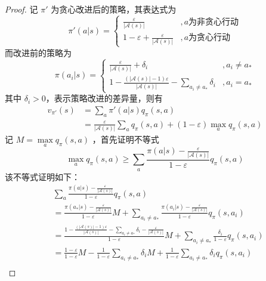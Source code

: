 \begin{proof}
    记 $\pi'$ 为贪心改进后的策略，其表达式为
    \begin{equation}
        \pi'(a|s)=
        \begin{cases}
            \frac{\varepsilon}{|\mathcal A(s)|}&, a\text{为非贪心行动}\\
            1-\varepsilon+\frac{\varepsilon}{|\mathcal A(s)|}&, a\text{为贪心行动}
        \end{cases}
    \end{equation}
    而改进前的策略为
    \begin{equation}
        \pi(a_i|s)=
\begin{cases}
\frac{\varepsilon}{|\mathcal A(s)|}+\delta_i&,a_i\neq a_*\\
1-\frac{(|\mathcal A(s)|-1)\varepsilon}{|\mathcal A(s)|}-\sum_{a_i\neq a_*}\delta_i&,a_i=a_*
\end{cases}
    \end{equation}
    其中 $\delta_i>0$，表示策略改进的差异量，则有
    \begin{equation}\label{eq:beforeineq}
        \begin{aligned}
            v_{\pi'}(s)&=\sum_a
            \pi'(a|s)q_\pi(s,a)\\
            &=\frac{\varepsilon}{|\mathcal A(s)|}\sum_aq_\pi(s,a)+(1-\varepsilon)\max\limits_aq_\pi(s,a)
            \end{aligned}
    \end{equation}
    记 $M=\max\limits_aq_\pi(s,a)$ ，首先证明不等式
    \begin{equation}\label{eq:ineq1}
        \displaystyle \max\limits_aq_\pi(s,a)\geq\sum_a\frac{\pi(a|s)-\frac{\varepsilon}{|\mathcal A(s)|}}{1-\varepsilon}q_\pi(s,a)
    \end{equation}
    该不等式证明如下：
    \[
        \begin{aligned}
            &\sum_a\frac{\pi(a|s)-\frac{\varepsilon}{|\mathcal A(s)|}}{1-\varepsilon}q_\pi(s,a)\\
            &=\frac{\pi(a_*|s)-\frac{\varepsilon}{|\mathcal A(s)|}}{1-\varepsilon}M+\sum_{a_i\neq a_*}\frac{\pi(a_i|s)-\frac{\varepsilon}{|\mathcal A(s)|}}{1-\varepsilon}q_\pi(s,a_i)\\
            &= \frac{1-\frac{(|\mathcal A(s)|-1)\varepsilon}{|\mathcal A(s)|}-\sum_{a_i\neq a_*}\delta_i-\frac{\varepsilon}{|\mathcal A(s)|}}{1-\varepsilon}M+\sum_{a_i\neq a_*}\frac{\delta_i}{1-\varepsilon}q_\pi(s,a_i)\\
            &=\frac{1-\varepsilon}{1-\varepsilon}M-\frac{1}{1-\varepsilon}\sum_{a_i\neq a_*}\delta_iM+\frac{1}{1-\varepsilon}\sum_{a_i\neq a_*}\delta_iq_\pi(s,a_i)\\

\end{aligned}\]
\end{proof}
